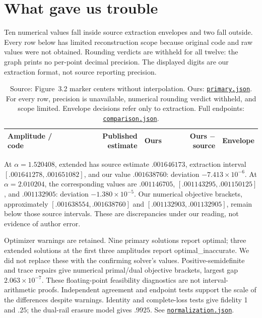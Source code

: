 \documentclass[11pt]{article}
\newcommand{\file}[2]{\href{https://github.com/alectionary/vibe-math/blob/master/formalization/denys-bosonic-pauli/#1}{\nolinkurl{#2}}}
\begin{document}
\section{What gave us trouble}
Ten numerical values fall inside source extraction envelopes and two fall outside. Every row below has limited reconstruction scope because original code and raw values were not obtained. Rounding verdicts are withheld for all twelve: the graph prints no per-point decimal precision. The displayed digits are our extraction format, not source reporting precision.
\begin{table}[ht]\centering\small
\begin{tabular}{lrrrr}\toprule Amplitude / code & Published estimate & Ours & Ours $-$ source & Envelope\\\midrule
\end{tabular}
\caption{Source: Figure~3.2 marker centers without interpolation. Ours: \file{outputs/primary.json}{primary.json}. For every row, precision is unavailable, numerical rounding verdict withheld, and scope limited. Envelope decisions refer only to extraction. Full endpoints: \file{outputs/comparison.json}{comparison.json}.}\end{table}

At $\alpha=1.520408$, extended has source estimate $.001646173$, extraction interval $[.001641278,.001651082]$, and our value $.001638760$: deviation $-7.413\times10^{-6}$. At $\alpha=2.010204$, the corresponding values are $.001146705$, $[.001143295,.001150125]$, and $.001132905$: deviation $-1.380\times10^{-5}$. Our numerical objective brackets, approximately $[.001638554,.001638760]$ and $[.001132903,.001132905]$, remain below those source intervals. These are discrepancies under our reading, not evidence of author error.

Optimizer warnings are retained. Nine primary solutions report optimal; three extended solutions at the first three amplitudes report optimal\_inaccurate. We did not replace these with the confirming solver's values. Positive-semidefinite and trace repairs give numerical primal/dual objective brackets, largest gap $2.063\times10^{-7}$. These floating-point feasibility diagnostics are not interval-arithmetic proofs. Independent agreement and endpoint tests support the scale of the differences despite warnings. Identity and complete-loss tests give fidelity 1 and $.25$; the dual-rail erasure model gives $.9925$. See \file{outputs/normalization.json}{normalization.json}.
\end{document}
